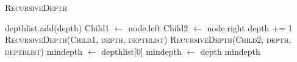 \documentclass{article}
\begin{document}
\begin{enumerate}
	\begin{algorithm}
		\caption{\textsc{RecursiveDepth}}
		\begin{algorithmic}[1]
				\State depthlist.add(depth)
			\EndIf
				\State Child1 $\gets$ node.left
				\State Child2 $\gets$ node.right
				\State depth += 1
				\State \textsc{RecursiveDepth(Child1, depth, depthlist)}
				\State \textsc{RecursiveDepth(Child2, depth, depthlist)}
			\EndIf
			\State mindepth $\gets$ depthlist[0]
					\State mindepth $\gets$ depth
				\EndIf
			\EndFor
			\State \Return mindepth
		\end{algorithmic}
	\end{algorithm}


\end{enumerate}
\end{document}
